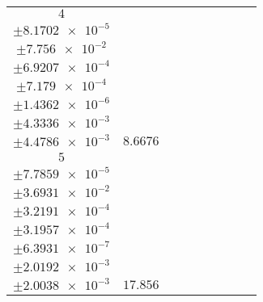 \documentclass[8pt]{article}
\begin{document}
\begin{longtable}[l]{c c c c c c c c c}
$\num{4}$ & \begin{tabular}[c]{@{}c@{}}$\num{6.0731e-2}$ \\ $\pm\num{8.1702e-5}$\end{tabular} & \begin{tabular}[c]{@{}c@{}}$\num{0.3384}$ \\ $\pm\num{7.756e-2}$\end{tabular} & \begin{tabular}[c]{@{}c@{}}$\num{12.901}$ \\ $\pm\num{6.9207e-4}$\end{tabular} & \begin{tabular}[c]{@{}c@{}}$\num{1.3471e+3}$ \\ $\pm\num{7.179e-4}$\end{tabular} & \begin{tabular}[c]{@{}c@{}}$\num{2.695}$ \\ $\pm\num{1.4362e-6}$\end{tabular} & \begin{tabular}[c]{@{}c@{}}$\num{2.7347}$ \\ $\pm\num{4.3336e-3}$\end{tabular} & \begin{tabular}[c]{@{}c@{}}$\num{2.8267}$ \\ $\pm\num{4.4786e-3}$\end{tabular} & $\num{8.6676}$\\
$\num{5}$ & \begin{tabular}[c]{@{}c@{}}$\num{0.12087}$ \\ $\pm\num{7.7859e-5}$\end{tabular} & \begin{tabular}[c]{@{}c@{}}$\num{-0.73566}$ \\ $\pm\num{3.6931e-2}$\end{tabular} & \begin{tabular}[c]{@{}c@{}}$\num{-7.3982}$ \\ $\pm\num{3.2191e-4}$\end{tabular} & \begin{tabular}[c]{@{}c@{}}$\num{1.3645e+3}$ \\ $\pm\num{3.1957e-4}$\end{tabular} & \begin{tabular}[c]{@{}c@{}}$\num{2.7298}$ \\ $\pm\num{6.3931e-7}$\end{tabular} & \begin{tabular}[c]{@{}c@{}}$\num{2.667}$ \\ $\pm\num{2.0192e-3}$\end{tabular} & \begin{tabular}[c]{@{}c@{}}$\num{2.63}$ \\ $\pm\num{2.0038e-3}$\end{tabular} & $\num{17.856}$\\

\end{longtable}
\end{document}
